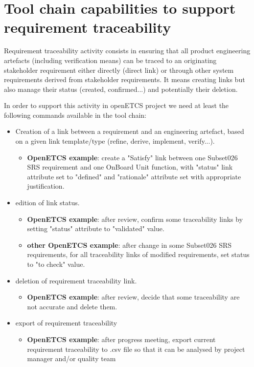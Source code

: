 \documentclass[11pt]{template/openetcs_report}
\begin{document}
\section{Tool chain capabilities to support requirement traceability}
\label{sec-3-2}  
Requirement traceability activity consists in ensuring that all product engineering artefacts (including verification means) can be traced to an originating stakeholder requirement either directly (direct link) or through other system requirements derived from stakeholder requirements. It means creating links but also manage their status (created, confirmed...) and potentially their deletion.

In order to support this activity in openETCS project we need at least the following commands available in the tool chain:

\begin{itemize}

\item Creation of a link between a requirement and an engineering artefact, based on a given link template/type (refine, derive, implement, verify...). 
\begin{itemize} \item \textbf{OpenETCS example}: create a "Satisfy" link between one Subset026 SRS requirement and one OnBoard Unit function, with  "status" link attribute set to "defined" and "rationale" attribute set with appropriate justification.\end{itemize}

\item edition of link status. 
\begin{itemize} \item \textbf{OpenETCS example}: after review, confirm some traceability links  by setting "status" attribute to "validated" value.
	\item \textbf{other OpenETCS example}: after change in some Subset026 SRS requirements, for all traceability links of modified requirements, set status to "to check" value.\end{itemize}

\item deletion of requirement traceability link. 
\begin{itemize} \item \textbf{OpenETCS example}: after review, decide that some traceability are not accurate and delete them.\end{itemize}

\item export of requirement traceability
\begin{itemize} \item \textbf{OpenETCS example}: after progress meeting, export current requirement traceability to .csv file so that it can be analysed by project manager and/or quality team\end{itemize}

\end{itemize}
\end{document}
